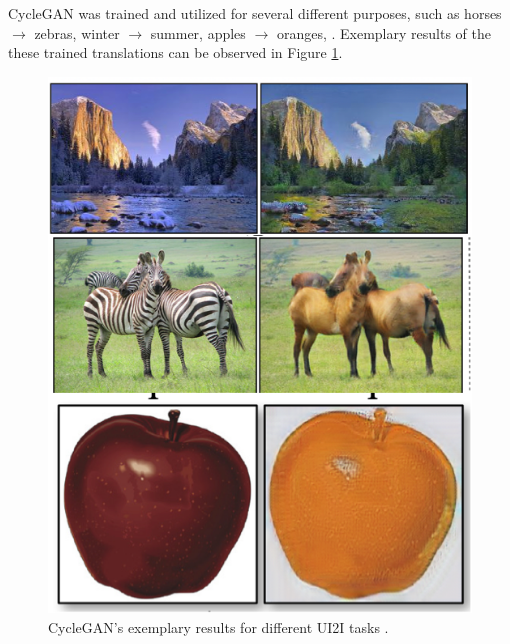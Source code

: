 CycleGAN was trained and utilized for several different purposes, such as horses $\rightarrow$ zebras, winter $\rightarrow$ summer, apples $\rightarrow$ oranges, \etc.
Exemplary results of the these trained translations can be observed in Figure \ref{fig:CycleGAN_results}.
\begin{figure}[H]
    \centering
    \includegraphics[width=0.3\linewidth]{../figs/related_work/CycleGAN_results.png}
    \caption{CycleGAN's exemplary results for different UI2I tasks \cite{CycleGAN2017}.}
    \label{fig:CycleGAN_results}
\end{figure}

